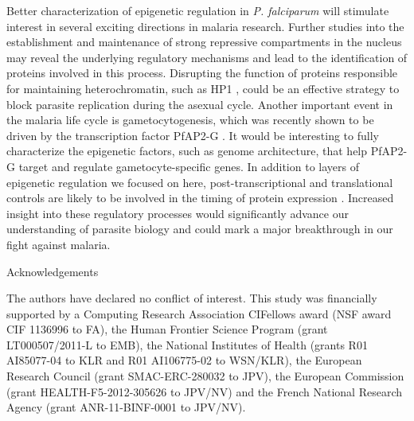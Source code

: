 Better characterization of epigenetic regulation in \textit{P. falciparum} will
stimulate interest in several exciting directions in malaria research. Further
studies into the establishment and maintenance of strong repressive
compartments in the nucleus may reveal the underlying regulatory mechanisms
and lead to the identification of proteins involved in this process.
Disrupting the function of proteins responsible for maintaining
heterochromatin, such as HP1 \citep{brancucci:heterochromatin},
could be an effective strategy to block
parasite replication during the asexual cycle. Another important event in the
malaria life cycle is gametocytogenesis, which was recently shown to be driven
by the transcription factor PfAP2-G \citep{kafsack:transcriptional,
sinha:cascade}. It would be interesting to fully
characterize the epigenetic factors, such as genome architecture, that help
PfAP2-G target and regulate gametocyte-specific genes. In addition to layers
of epigenetic regulation we focused on here, post-transcriptional and
translational controls are likely to be involved in the timing of protein
expression \citep{suvorova:transcript, kramer:rna, bunnik:polysome, leroch:global}.
Increased insight into these regulatory processes
would significantly advance our understanding of parasite biology and could
mark a major breakthrough in our fight against malaria.


Acknowledgements

The authors have declared no conflict of interest.
This study was financially supported by a Computing Research Association
CIFellows award (NSF award CIF 1136996 to FA), the Human Frontier Science
Program (grant LT000507/2011-L to EMB), the National Institutes of Health
(grants R01 AI85077-04 to KLR and R01 AI106775-02 to WSN/KLR), the European
Research Council (grant SMAC-ERC-280032 to JPV), the European Commission
(grant HEALTH-F5-2012-305626 to JPV/NV) and the French National Research
Agency (grant ANR-11-BINF-0001 to JPV/NV).

